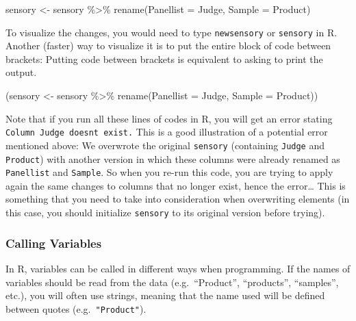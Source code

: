 \documentclass[
]{book}
\newenvironment{Shaded}{\begin{snugshade}}{\end{snugshade}}
\newcommand{\AttributeTok}[1]{\textcolor[rgb]{0.77,0.63,0.00}{#1}}
\newcommand{\FunctionTok}[1]{\textcolor[rgb]{0.00,0.00,0.00}{#1}}
\newcommand{\NormalTok}[1]{#1}
\newcommand{\OtherTok}[1]{\textcolor[rgb]{0.56,0.35,0.01}{#1}}
\newcommand{\SpecialCharTok}[1]{\textcolor[rgb]{0.00,0.00,0.00}{#1}}
\begin{document}
\begin{Shaded}
\begin{Highlighting}[]
\NormalTok{sensory }\OtherTok{\textless{}{-}}\NormalTok{ sensory }\SpecialCharTok{\%\textgreater{}\%} 
  \FunctionTok{rename}\NormalTok{(}\AttributeTok{Panellist =}\NormalTok{ Judge, }\AttributeTok{Sample =}\NormalTok{ Product)}
\end{Highlighting}
\end{Shaded}

To visualize the changes, you would need to type \texttt{newsensory} or \texttt{sensory} in R.
Another (faster) way to visualize it is to put the entire block of code between brackets: Putting code between brackets is equivalent to asking to print the output.

\begin{Shaded}
\begin{Highlighting}[]
\NormalTok{(sensory }\OtherTok{\textless{}{-}}\NormalTok{ sensory }\SpecialCharTok{\%\textgreater{}\%} 
  \FunctionTok{rename}\NormalTok{(}\AttributeTok{Panellist =}\NormalTok{ Judge, }\AttributeTok{Sample =}\NormalTok{ Product))}
\end{Highlighting}
\end{Shaded}

Note that if you run all these lines of codes in R, you will get an error stating \texttt{Column\ \textquotesingle{}Judge\textquotesingle{}\ doesn\textquotesingle{}t\ exist.} This is a good illustration of a potential error mentioned above: We overwrote the original \texttt{sensory} (containing \texttt{Judge} and \texttt{Product}) with another version in which these columns were already renamed as \texttt{Panellist} and \texttt{Sample}. So when you re-run this code, you are trying to apply again the same changes to columns that no longer exist, hence the error\ldots{}
This is something that you need to take into consideration when overwriting elements (in this case, you should initialize \texttt{sensory} to its original version before trying).

\hypertarget{calling-variables}{%
\subsubsection{Calling Variables}\label{calling-variables}}

In R, variables can be called in different ways when programming. If the names of variables should be read from the data (e.g.~``Product'', ``products'', ``samples'', etc.), you will often use strings, meaning that the name used will be defined between quotes (e.g.~\texttt{"Product"}).
\end{document}
